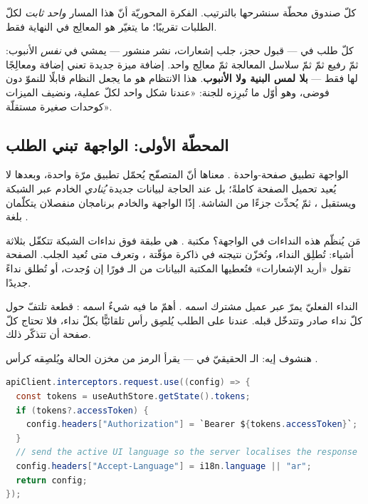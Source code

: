 كلّ صندوق محطّة سنشرحها بالترتيب. الفكرة المحوريّة أنّ هذا المسار \emph{واحد ثابت}
لكلّ الطلبات تقريبًا؛ ما يتغيّر هو المعالِج في النهاية فقط.

\begin{spotlight}
كلّ طلب في  — قبول حجز، جلب إشعارات، نشر منشور — يمشي في
\emph{نفس} الأنبوب:  ثمّ  رفيع ثمّ 
ثمّ سلاسل المعالجة ثمّ معالِج واحد. إضافة ميزة جديدة تعني إضافة
 ومعالِجًا لها فقط — \textbf{بلا لمس البنية ولا الأنبوب}.
هذا الانتظام هو ما يجعل النظام قابلًا للنموّ دون فوضى، وهو أوّل ما تُبرِزه للجنة:
«عندنا شكل واحد لكلّ عملية، ونضيف الميزات كوحدات صغيرة مستقلّة».
\end{spotlight}

\subsection{المحطّة الأولى: الواجهة  تبني الطلب}

الواجهة تطبيق صفحة-واحدة . معناها أنّ المتصفّح
يُحمّل تطبيق  مرّة واحدة، وبعدها لا يُعيد تحميل الصفحة كاملةً؛ بل عند الحاجة
لبيانات جديدة \emph{يُنادي} الخادم عبر الشبكة ويستقبل ، ثمّ يُحدِّث جزءًا من
الشاشة. إذًا الواجهة والخادم برنامجان منفصلان يتكلّمان بلغة .

مَن يُنظّم هذه النداءات في الواجهة؟ مكتبة . هي طبقة فوق نداءات
الشبكة تتكفّل بثلاثة أشياء: تُطلِق النداء، وتُخزّن نتيجته في ذاكرة مؤقّتة
، وتعرف متى تُعيد الجلب. الصفحة تقول «أريد الإشعارات» فتُعطيها المكتبة
البيانات من الـ  فورًا إن وُجدت، أو تُطلق نداءً جديدًا.

النداء الفعليّ يمرّ عبر عميل  مشترك اسمه . أهمّ ما فيه شيءٌ
اسمه : قطعة تلتفّ حول كلّ نداء صادر وتتدخّل قبله. عندنا
 على الطلب يُلصِق رأس  تلقائيًّا بكلّ نداء، فلا
تحتاج كلّ صفحة أن تتذكّر ذلك.

هنشوف إيه: الـ  الحقيقيّ في  — يقرأ الرمز من
مخزن الحالة ويُلصِقه كرأس .

\begin{english}
\begin{lstlisting}[language=Java]
apiClient.interceptors.request.use((config) => {
  const tokens = useAuthStore.getState().tokens;
  if (tokens?.accessToken) {
    config.headers["Authorization"] = `Bearer ${tokens.accessToken}`;
  }
  // send the active UI language so the server localises the response
  config.headers["Accept-Language"] = i18n.language || "ar";
  return config;
});
\end{lstlisting}
\end{english}

